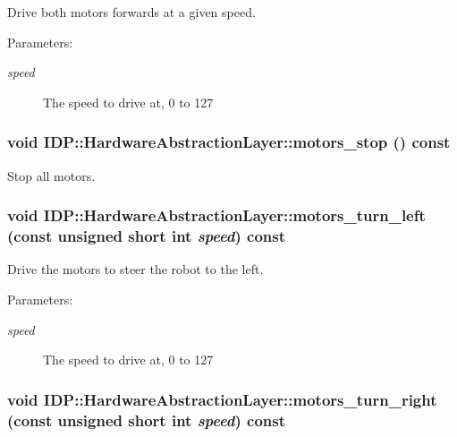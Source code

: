 Drive both motors forwards at a given speed. \begin{Desc}
\item[Parameters:]
\begin{description}
\item[{\em speed}]The speed to drive at, 0 to 127 \end{description}
\end{Desc}
\hypertarget{classIDP_1_1HardwareAbstractionLayer_186e188450a83ec4174670e1eb6c40bb}{
\subsubsection[{motors\_\-stop}]{\setlength{\rightskip}{0pt plus 5cm}void IDP::HardwareAbstractionLayer::motors\_\-stop () const}}
\label{classIDP_1_1HardwareAbstractionLayer_186e188450a83ec4174670e1eb6c40bb}


Stop all motors. \hypertarget{classIDP_1_1HardwareAbstractionLayer_deb07393ffab83877500183162c0bed2}{
\subsubsection[{motors\_\-turn\_\-left}]{\setlength{\rightskip}{0pt plus 5cm}void IDP::HardwareAbstractionLayer::motors\_\-turn\_\-left (const unsigned short int {\em speed}) const}}
\label{classIDP_1_1HardwareAbstractionLayer_deb07393ffab83877500183162c0bed2}


Drive the motors to steer the robot to the left. \begin{Desc}
\item[Parameters:]
\begin{description}
\item[{\em speed}]The speed to drive at, 0 to 127 \end{description}
\end{Desc}
\hypertarget{classIDP_1_1HardwareAbstractionLayer_bf4317f045b498e7e67aff208fa8d519}{
\subsubsection[{motors\_\-turn\_\-right}]{\setlength{\rightskip}{0pt plus 5cm}void IDP::HardwareAbstractionLayer::motors\_\-turn\_\-right (const unsigned short int {\em speed}) const}}
\label{classIDP_1_1HardwareAbstractionLayer_bf4317f045b498e7e67aff208fa8d519}


